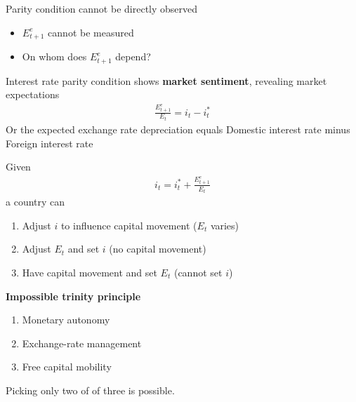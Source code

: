 \documentclass{beamer}
\begin{document}
\begin{frame}
  Parity condition cannot be directly observed
  \begin{itemize}
    \item $E^e_{t+1}$ cannot be measured
    \item On whom does $E^e_{t+1}$ depend? 
  \end{itemize}  
 Interest rate parity condition shows \textbf{market sentiment}, revealing market expectations
  \begin{align}
      \frac{E^e_{t+1}}{E_t} = i_t - i^*_t 
  \end{align} 
  Or the expected exchange rate depreciation equals Domestic interest rate minus Foreign interest rate  
\end{frame}

\begin{frame}
  Given 
  \begin{align}
    i_t = i^*_t +  \frac{E^e_{t+1}}{E_t}
  \end{align}
   a country can 
  \begin{enumerate}
    \item Adjust $i$ to influence capital movement ($E_t$ varies)
    \item Adjust $E_t$ and set $i$ (no capital movement)
    \item Have capital movement and set $E_t$ (cannot set $i$)
  \end{enumerate}
\end{frame}

\begin{frame}
  \textbf{Impossible trinity principle}
  \begin{enumerate}
    \item Monetary autonomy
    \item Exchange-rate management
    \item Free capital mobility    
  \end{enumerate}
  \medskip
  Picking only two of of three is possible.
\end{frame}
\end{document}
